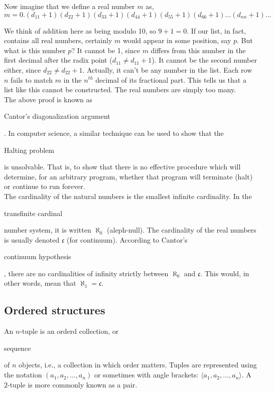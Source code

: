 \documentclass[11pt]{article}
\theoremstyle{plain}
\theoremstyle{definition}
\begin{document}
\noindent Now imagine that we define a real number $ m $ as,
$$
m = 0.(d_{11}+1)(d_{22}+1)(d_{33}+1)(d_{44}+1)(d_{55}+1)(d_{66}+1) ... (d_{nn}+1) ...
$$

\noindent We think of addition here as being modulo 10, so $ 9 + 1 = 0 $. If our list, in fact, contains all real numbers, certainly $ m $ would appear in some position, say $ p $. But what is this number $ p $? It cannot be 1, since $ m $ differs from this number in the first decimal after the radix point ($ d_{11} \ne d_{11} + 1 $). It cannot be the second number either, since $ d_{22} \ne d_{22} + 1 $. Actually, it can't be any number in the list. Each row $ n $ fails to match $ m $ in the $ n^{th} $ decimal of its fractional part. This tells us that a list like this cannot be constructed. The real numbers are simply too many. \\

\noindent The above proof is known as \begin{em}Cantor's diagonalization argument\end{em}. In computer science, a similar technique can be used to show that the \begin{em}Halting problem\end{em} is unsolvable. That is, to show that there is no effective procedure which will determine, for an arbitrary program, whether that program will terminate (halt) or continue to run forever. \\

\noindent The cardinality of the natural numbers is the smallest infinite cardinality. In the \begin{em}transfinite cardinal\end{em} number system, it is written $ \aleph_0 $ (aleph-null). The cardinality of the real numbers is usually denoted $ \mathfrak{c} $ (for continuum). 
According to Cantor's \begin{em}continuum hypothesis\end{em}, there are no cardinalities of infinity strictly between $ \aleph_0 $ and $ \mathfrak{c} $. This would, in other words, mean that $ \aleph_1 = \mathfrak{c} $. 

\subsection*{Ordered structures}

An $ n $-tuple is an orderd collection, or \begin{em}sequence\end{em} of $ n $ objects, i.e., a collection in which order matters. Tuples are represented using the notation $ ( a_1, a_2, ..., a_n ) $ or sometimes with angle brackets: $ \langle a_1, a_2, ..., a_n \rangle $. A $ 2 $-tuple is more commonly known as a pair.
\end{document}
